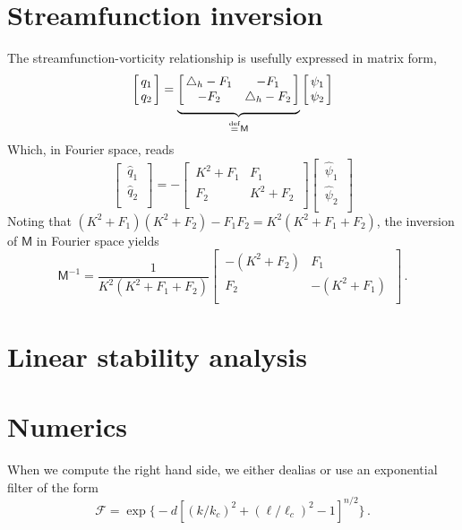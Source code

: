 \documentclass[12pt, oneside]{article}
\newcommand*\mystrut[1]{\vrule width0pt height0pt depth#1\relax}
\newcommand{\per}{\, .}
\newcommand{\defn}{\ensuremath{\stackrel{\mathrm{def}}{=}}}
\newcommand{\beq}{\begin{equation}}
\newcommand{\eeq}{\end{equation}}
\newcommand{\hlap}{\triangle_h}
\begin{document}
\section{Streamfunction inversion}

The streamfunction-vorticity relationship is usefully expressed in matrix form, 
\beq
\left [ \, \begin{matrix}
q_1 \\
q_2 \\
\end{matrix} \, \right ] = \underbrace{ \mystrut{3ex} \left [ \,
\begin{matrix} 
\hlap - F_1 & - F_1 \\
- F_2 & \hlap - F_2 \\
\end{matrix} \, \right ]}_{\defn \mathsf{M}} \left [ \, \begin{matrix}
\psi_1 \\
\psi_2 \\
\end{matrix} \, \right ]
\eeq
Which, in Fourier space, reads
\beq
\left [ \, \begin{matrix}
\hat q_1 \\
\hat q_2 \\
\end{matrix} \, \right ] = - \left [ \,
\begin{matrix} 
K^2 + F_1 & F_1 \\
F_2 & K^2 + F_2  \\
\end{matrix} \, \right ] \left [ \, \begin{matrix}
\hat \psi_1 \\
\hat \psi_2 \\
\end{matrix} \, \right ]
\eeq
Noting that $\left ( K^2 + F_1 \right ) \left ( K^2 + F_2 \right ) - F_1 F_2 = K^2 \left ( K^2 + F_1 + F_2 \right )$, the inversion of $\mathsf{M}$ in Fourier space yields
\beq
\mathsf{M}^{-1} = \frac{1}{K^2 \left ( K^2 + F_1 + F_2 \right )} \left [ \,
\begin{matrix}
- \left ( K^2 + F_2 \right ) & F_1 \\
F_2 & - \left (K^2 + F_1\right ) \\
\end{matrix} \, \right ] \per
\eeq

\section{Linear stability analysis}

\section{Numerics}

When we compute the right hand side, we either dealias or use an exponential filter of the form
\beq
\mathscr{F} = \exp \Big \{ - d \left [ \left ( k / k_c \right )^2 + \left ( \ell / \ell_c \right )^2 - 1 \right ]^{n/2} \Big \} \per
\eeq



\end{document}

